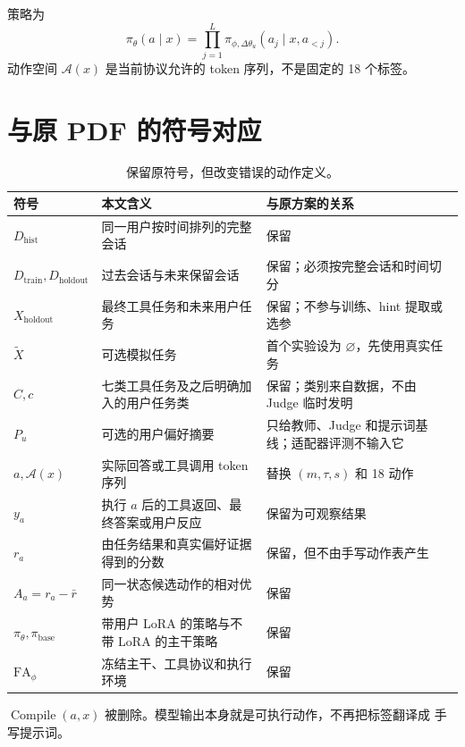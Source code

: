 \documentclass[11pt,UTF8,fontset=fandol]{ctexart}
\newcommand{\Dhist}{D_{\mathrm{hist}}}
\newcommand{\Dtrain}{D_{\mathrm{train}}}
\newcommand{\Dholdout}{D_{\mathrm{holdout}}}
\newcommand{\Xholdout}{X_{\mathrm{holdout}}}
\newcommand{\Xsim}{\widetilde X}
\newcommand{\FA}{\mathrm{FA}_{\phi}}
\newcommand{\policy}{\pi_{\theta}}
\newcommand{\basepolicy}{\pi_{\mathrm{base}}}
\newcommand{\lora}{\Delta\theta_u}
\begin{document}
策略为
\begin{equation}
  \policy(a\mid x)
  =\prod_{j=1}^{L}
    \pi_{\phi,\lora}(a_j\mid x,a_{<j}).
  \label{eq:policy}
\end{equation}
动作空间 \(\mathcal A(x)\) 是当前协议允许的 token 序列，不是固定的 18 个标签。

\section{与原 PDF 的符号对应}

\begin{table}[H]
  \centering
  \caption{保留原符号，但改变错误的动作定义。}
  \begin{tabularx}{\textwidth}{@{}L{0.20\textwidth}L{0.33\textwidth}Y@{}}
    \toprule
    符号 & 本文含义 & 与原方案的关系 \\
    \midrule
    \(\Dhist\) &
    同一用户按时间排列的完整会话 &
    保留 \\
    \(\Dtrain,\Dholdout\) &
    过去会话与未来保留会话 &
    保留；必须按完整会话和时间切分 \\
    \(\Xholdout\) &
    最终工具任务和未来用户任务 &
    保留；不参与训练、hint 提取或选参 \\
    \(\Xsim\) &
    可选模拟任务 &
    首个实验设为 \(\varnothing\)，先使用真实任务 \\
    \(C,c\) &
    七类工具任务及之后明确加入的用户任务类 &
    保留；类别来自数据，不由 Judge 临时发明 \\
    \(P_u\) &
    可选的用户偏好摘要 &
    只给教师、Judge 和提示词基线；适配器评测不输入它 \\
    \(a,\mathcal A(x)\) &
    实际回答或工具调用 token 序列 &
    替换 \((m,\tau,s)\) 和 18 动作 \\
    \(y_a\) &
    执行 \(a\) 后的工具返回、最终答案或用户反应 &
    保留为可观察结果 \\
    \(r_a\) &
    由任务结果和真实偏好证据得到的分数 &
    保留，但不由手写动作表产生 \\
    \(A_a=r_a-\bar r\) &
    同一状态候选动作的相对优势 &
    保留 \\
    \(\policy,\basepolicy\) &
    带用户 LoRA 的策略与不带 LoRA 的主干策略 &
    保留 \\
    \(\FA\) &
    冻结主干、工具协议和执行环境 &
    保留 \\
    \bottomrule
  \end{tabularx}
\end{table}

\(\operatorname{Compile}(a,x)\) 被删除。模型输出本身就是可执行动作，不再把标签翻译成
手写提示词。
\end{document}
